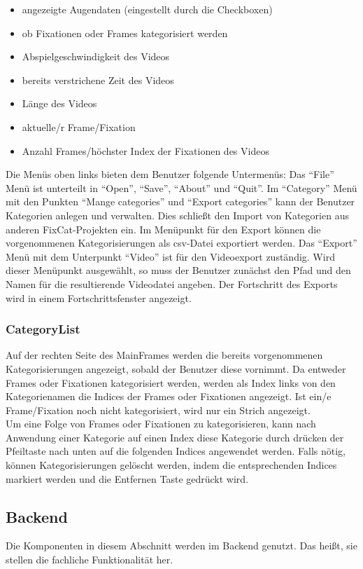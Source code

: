 \documentclass[a4paper,draft]{scrartcl}
\begin{document}
\begin{itemize}
\item angezeigte Augendaten (eingestellt durch die Checkboxen)
\item ob Fixationen oder Frames kategorisiert werden
\item Abspielgeschwindigkeit des Videos
\item bereits verstrichene Zeit des Videos
\item Länge des Videos
\item aktuelle/r Frame/Fixation 
\item Anzahl Frames/höchster Index der Fixationen des Videos
\end{itemize}
Die Menüs oben links bieten dem Benutzer folgende Untermenüs:
Das "`File"' Menü ist unterteilt in "`Open"', "`Save"', "`About"' und "`Quit"'. 
Im "`Category"' Menü mit den Punkten "`Mange categories"' und "`Export categories"' kann der Benutzer Kategorien anlegen und verwalten. Dies schließt den Import von Kategorien aus anderen FixCat-Projekten ein.
Im Menüpunkt für den Export können die vorgenommenen Kategorisierungen als csv-Datei exportiert werden. 
Das "`Export"' Menü mit dem Unterpunkt "`Video"' ist für den Videoexport zuständig. Wird dieser Menüpunkt ausgewählt, so muss der Benutzer zunächst den Pfad und den Namen für die resultierende Videodatei angeben. Der Fortschritt des Exports wird in einem Fortschrittsfenster angezeigt.


\subsubsection{CategoryList}
Auf der rechten Seite des MainFrames werden die bereits vorgenommenen Kategorisierungen angezeigt, sobald der Benutzer diese vornimmt. 
Da entweder Frames oder Fixationen kategorisiert werden, werden als Index links von den Kategorienamen die Indices der Frames oder Fixationen angezeigt. Ist ein/e Frame/Fixation noch nicht kategorisiert, wird nur ein Strich angezeigt. \\
Um eine Folge von Frames oder Fixationen zu kategorisieren, kann nach Anwendung einer Kategorie auf einen Index diese Kategorie durch drücken der Pfeiltaste nach unten auf die folgenden Indices angewendet werden.
Falls nötig, können Kategorisierungen gelöscht werden, indem die entsprechenden Indices markiert werden und die Entfernen Taste gedrückt wird. 

\subsection{Backend}
Die Komponenten in diesem Abschnitt werden im Backend genutzt.
Das hei\ss t, sie stellen die fachliche Funktionalit\"at her.
\end{document}
